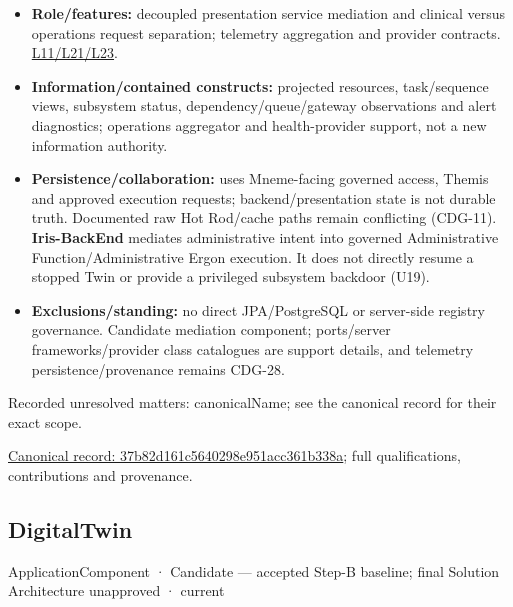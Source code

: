 \begin{itemize}


\item \textbf{Role/features:} decoupled presentation service mediation and clinical versus
  operations request separation; telemetry aggregation and provider contracts.
  \href{\detokenize{../../../../../docs/markdown/05-information-systems-architecture/sources.md#l11}}{L11/L21/L23}.

\item \textbf{Information/contained constructs:} projected resources, task/sequence views,
  subsystem status, dependency/queue/gateway observations and alert diagnostics;
  operations aggregator and health-provider support, not a new information authority.

\item \textbf{Persistence/collaboration:} uses Mneme-facing governed access, Themis and
  approved execution requests; backend/presentation state is not durable truth.
  Documented raw Hot Rod/cache paths remain conflicting (CDG-11).
  \textbf{Iris-BackEnd} mediates administrative intent into governed Administrative
  Function/Administrative Ergon execution. It does not directly resume a stopped
  Twin or provide a privileged subsystem backdoor (U19).

\item \textbf{Exclusions/standing:} no direct JPA/PostgreSQL or server-side registry governance.
  Candidate mediation component; ports/server frameworks/provider class catalogues
  are support details, and telemetry persistence/provenance remains CDG-28.

\end{itemize}

{\small Recorded unresolved matters: canonicalName; see the canonical record for their exact scope.}\par
{\footnotesize \href{../../../../continuum/application/application-component/37b82d161c5640298e951acc361b338a.md}{Canonical record: 37b82d161c5640298e951acc361b338a}; full qualifications, contributions and provenance.}\par
\subsection{DigitalTwin}

\label{element:3f64d339648246e99e8866c8089f8960}
{\small ApplicationComponent · Candidate — accepted Step-B baseline; final Solution Architecture unapproved · current}\par

